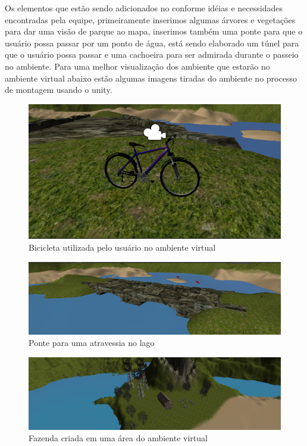 Os elementos que estão sendo adicionados no conforme idéias e necessidades encontradas
pela equipe, primeiramente inserimos algumas árvores e vegetações para dar uma visão
de parque ao mapa, inserimos também uma ponte para que o usuário possa passar por um 
ponto de água, está sendo elaborado um túnel para que o usuário possa passar e uma 
cachoeira para ser admirada durante o passeio no ambiente. Para uma melhor visualização 
dos ambiente que estarão no ambiente virtual abaixo estão algumas imagens tiradas do ambiente
 no processo de montagem usando o unity.

\begin{figure}[htpb]
 \begin{center}
    \includegraphics[width=.60\textwidth]{figuras/bicycle.png}
 \end{center}
  \caption{Bicicleta utilizada pelo usuário no ambiente virtual}
  \label{fig:core_concurrent}
\end{figure}

\begin{figure}[htpb]
 \begin{center}
    \includegraphics[width=.60\textwidth]{figuras/bridge.png}
 \end{center}
  \caption{Ponte para uma atravessia no lago}
  \label{fig:core_concurrent}
\end{figure}

\begin{figure}[htpb]
 \begin{center}
    \includegraphics[width=.60\textwidth]{figuras/farm.png}
 \end{center}
  \caption{Fazenda criada em uma área do ambiente virtual}
  \label{fig:core_concurrent}
\end{figure}

